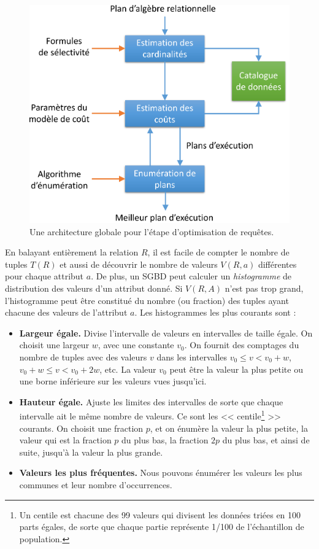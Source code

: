 \begin{figure}
\begin{center}
\includegraphics[scale=0.55]{chapitre2/chap2Fig/query-optimization.pdf}
\caption{Une architecture globale pour l'étape d'optimisation de requêtes.}
 \label{fig:query-optimization}
\end{center}
\end{figure}

En balayant entièrement la relation $R$, il est facile de compter le nombre de tuples $T(R)$ et aussi de découvrir le nombre de valeurs $V(R, a)$ différentes pour chaque attribut $a$. De plus, un SGBD peut calculer un \textit{histogramme} de distribution des valeurs d'un attribut donné. Si $V(R, A)$ n'est pas trop grand, l'histogramme peut être constitué du nombre (ou fraction) des tuples ayant chacune des valeurs de l'attribut $a$. Les histogrammes les plus courants sont \cite{Poosala96} :
\begin{itemize}
 \item \textbf{Largeur égale.} Divise l'intervalle de valeurs en intervalles de taille égale. On choisit une largeur $w$, avec une constante $v_0$. On fournit des comptages du nombre de tuples avec des valeurs $v$ dans les intervalles $v_0 \leq v < v_0 + w$, $v_0 + w \leq v < v_0 + 2 w$, etc. La valeur $v_0$ peut être la valeur la plus petite ou une borne inférieure sur les valeurs vues jusqu'ici.
 \item \textbf{Hauteur égale.} Ajuste les limites des intervalles de sorte que chaque intervalle ait le même nombre de valeurs. Ce sont les << centile\footnote{Un centile est chacune des 99 valeurs qui divisent les données triées en 100 parts égales, de sorte que chaque partie représente 1/100 de l'échantillon de population.} >> courants. On choisit une fraction $p$, et on énumère la valeur la plus petite, la valeur qui est la fraction $p$ du plus bas, la fraction $2p$ du plus bas, et ainsi de suite, jusqu'à la valeur la plus grande.
 \item \textbf{Valeurs les plus fréquentes.} Nous pouvons énumérer les valeurs les plus communes et leur nombre d'occurrences.
\end{itemize}

